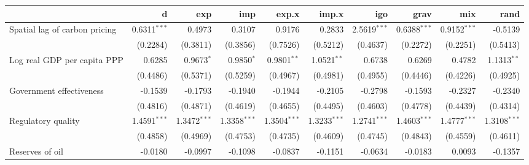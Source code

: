 \begin{tabular}{lrrrrrrrrr}
\toprule
{} &                 d &               exp &               imp &             exp.x &             imp.x &               igo &              grav &               mix &              rand \\
\midrule
Spatial lag of carbon pricing    &  0.6311$^{* * *}$ &            0.4973 &            0.3107 &            0.9176 &            0.2833 &  2.5619$^{* * *}$ &  0.6388$^{* * *}$ &  0.9152$^{* * *}$ &           -0.5139 \\
                                 &          (0.2284) &          (0.3811) &          (0.3856) &          (0.7526) &          (0.5212) &          (0.4637) &          (0.2272) &          (0.2251) &          (0.5413) \\
Log real GDP per capita PPP      &            0.6285 &      0.9673$^{*}$ &      0.9850$^{*}$ &    0.9801$^{* *}$ &    1.0521$^{* *}$ &            0.6738 &            0.6269 &            0.4782 &    1.1313$^{* *}$ \\
                                 &          (0.4486) &          (0.5371) &          (0.5259) &          (0.4967) &          (0.4981) &          (0.4955) &          (0.4446) &          (0.4226) &          (0.4925) \\
Government effectiveness         &           -0.1539 &           -0.1793 &           -0.1940 &           -0.1944 &           -0.2105 &           -0.2798 &           -0.1593 &           -0.2327 &           -0.2340 \\
                                 &          (0.4816) &          (0.4871) &          (0.4619) &          (0.4655) &          (0.4495) &          (0.4603) &          (0.4778) &          (0.4439) &          (0.4314) \\
Regulatory quality               &  1.4591$^{* * *}$ &  1.3472$^{* * *}$ &  1.3358$^{* * *}$ &  1.3504$^{* * *}$ &  1.3233$^{* * *}$ &  1.2741$^{* * *}$ &  1.4603$^{* * *}$ &  1.4777$^{* * *}$ &  1.3108$^{* * *}$ \\
                                 &          (0.4858) &          (0.4969) &          (0.4753) &          (0.4735) &          (0.4609) &          (0.4745) &          (0.4843) &          (0.4559) &          (0.4611) \\
Reserves of oil                  &           -0.0180 &           -0.0997 &           -0.1098 &           -0.0837 &           -0.1151 &           -0.0634 &           -0.0183 &            0.0093 &           -0.1357 \\

\end{tabular}
